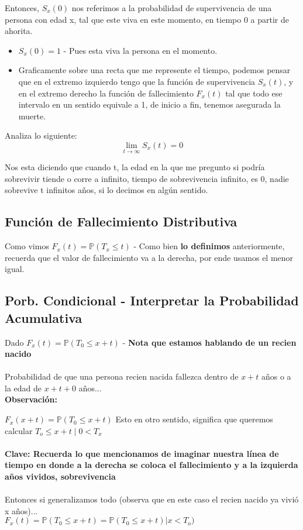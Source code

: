 \documentclass{article}
\begin{document}
Entonces, \(S_x(0)\) nos referimos a la probabilidad de supervivencia de una persona con edad x, tal que este viva en este momento, en tiempo 0 a partir de ahorita.
\begin{itemize}
    \item \(S_x(0) = 1\) - Pues esta viva la persona en el momento.
    \item Graficamente sobre una recta que me represente el tiempo, podemos pensar que en el extremo izquierdo tengo que la función de supervivencia \(S_x(t)\), y en el extremo derecho la función de fallecimiento \(F_x(t)\) tal que todo ese intervalo en un sentido equivale a 1, de inicio a fin, tenemos asegurada la muerte.
\end{itemize}
Analiza lo siguiente:
\[\lim_{t\rightarrow\infty} S_x(t)=0\]

Nos esta diciendo que cuando t, la edad en la que me pregunto si podría sobrevivir tiende o corre a infinito, tiempo de sobrevivencia infinito, es 0, nadie sobrevive t infinitos años, si lo decimos en algún sentido.

\subsection*{Función de Fallecimiento Distributiva}
Como vimos \(F_x(t) = \mathbb{P}(T_x \leq t)\) - Como bien \textbf{lo definimos} anteriormente, recuerda que el valor de fallecimiento va a la derecha, por ende usamos el menor igual.

\subsection*{Porb. Condicional - Interpretar la Probabilidad Acumulativa}

Dado \(F_x(t) = \mathbb{P}(T_0 \leq x+t)\) - \textbf{Nota que estamos hablando de un recien nacido}
\\\\
Probabilidad de que una persona recien nacida fallezca dentro de \(x+t\) años o a la edad de \(x+t+0\) años... 
\\
\textbf{Observación:}

\(F_x(x+t) = \mathbb{P}(T_0 \leq x+t)\) Esto en otro sentido, significa que queremos calcular \(T_o \leq x+t\;|\;0<T_x\)
\\\\
\textbf{Clave: Recuerda lo que mencionamos de imaginar nuestra línea de tiempo en donde a la derecha se coloca el fallecimiento y a la izquierda años vividos, sobrevivencia}
\\\\
Entonces si generalizamos todo (observa que en este caso el recien nacido ya vivió x años)... 
\\
\(F_x(t) = \mathbb{P}(T_0 \leq x+t) = \mathbb{P}(T_0 \leq x+t) | x<T_o)\)
\end{document}
